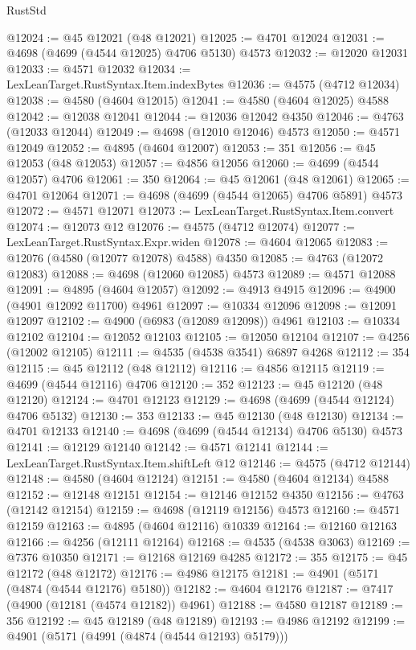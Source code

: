 \begin{lexlean}{RustStd}
\begin{coremodule}
@12024 := @45 @12021 (@48 @12021)
@12025 := @4701 @12024
@12031 := @4698 (@4699 (@4544 @12025) @4706 @5130) @4573
@12032 := @12020 @12031
@12033 := @4571 @12032
@12034 := LexLeanTarget.RustSyntax.Item.indexBytes
@12036 := @4575 (@4712 @12034)
@12038 := @4580 (@4604 @12015)
@12041 := @4580 (@4604 @12025) @4588
@12042 := @12038 @12041
@12044 := @12036 @12042 @4350
@12046 := @4763 (@12033 @12044)
@12049 := @4698 (@12010 @12046) @4573
@12050 := @4571 @12049
@12052 := @4895 (@4604 @12007)
@12053 := 351
@12056 := @45 @12053 (@48 @12053)
@12057 := @4856 @12056
@12060 := @4699 (@4544 @12057) @4706
@12061 := 350
@12064 := @45 @12061 (@48 @12061)
@12065 := @4701 @12064
@12071 := @4698 (@4699 (@4544 @12065) @4706 @5891) @4573
@12072 := @4571 @12071
@12073 := LexLeanTarget.RustSyntax.Item.convert
@12074 := @12073 @12
@12076 := @4575 (@4712 @12074)
@12077 := LexLeanTarget.RustSyntax.Expr.widen
@12078 := @4604 @12065
@12083 := @12076 (@4580 (@12077 @12078) @4588) @4350
@12085 := @4763 (@12072 @12083)
@12088 := @4698 (@12060 @12085) @4573
@12089 := @4571 @12088
@12091 := @4895 (@4604 @12057)
@12092 := @4913 @4915
@12096 := @4900 (@4901 @12092 @11700) @4961
@12097 := @10334 @12096
@12098 := @12091 @12097
@12102 := @4900 (@6983 (@12089 @12098)) @4961
@12103 := @10334 @12102
@12104 := @12052 @12103
@12105 := @12050 @12104
@12107 := @4256 (@12002 @12105)
@12111 := @4535 (@4538 @3541) @6897 @4268
@12112 := 354
@12115 := @45 @12112 (@48 @12112)
@12116 := @4856 @12115
@12119 := @4699 (@4544 @12116) @4706
@12120 := 352
@12123 := @45 @12120 (@48 @12120)
@12124 := @4701 @12123
@12129 := @4698 (@4699 (@4544 @12124) @4706 @5132)
@12130 := 353
@12133 := @45 @12130 (@48 @12130)
@12134 := @4701 @12133
@12140 := @4698 (@4699 (@4544 @12134) @4706 @5130) @4573
@12141 := @12129 @12140
@12142 := @4571 @12141
@12144 := LexLeanTarget.RustSyntax.Item.shiftLeft @12
@12146 := @4575 (@4712 @12144)
@12148 := @4580 (@4604 @12124)
@12151 := @4580 (@4604 @12134) @4588
@12152 := @12148 @12151
@12154 := @12146 @12152 @4350
@12156 := @4763 (@12142 @12154)
@12159 := @4698 (@12119 @12156) @4573
@12160 := @4571 @12159
@12163 := @4895 (@4604 @12116) @10339
@12164 := @12160 @12163
@12166 := @4256 (@12111 @12164)
@12168 := @4535 (@4538 @3063)
@12169 := @7376 @10350
@12171 := @12168 @12169 @4285
@12172 := 355
@12175 := @45 @12172 (@48 @12172)
@12176 := @4986 @12175
@12181 := @4901 (@5171 (@4874 (@4544 @12176) @5180))
@12182 := @4604 @12176
@12187 := @7417 (@4900 (@12181 (@4574 @12182)) @4961)
@12188 := @4580 @12187
@12189 := 356
@12192 := @45 @12189 (@48 @12189)
@12193 := @4986 @12192
@12199 := @4901 (@5171 (@4991 (@4874 (@4544 @12193) @5179)))

\end{coremodule}
\end{lexlean}
